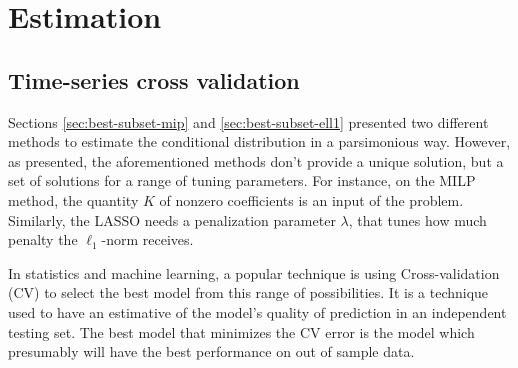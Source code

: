 \section{Estimation}

\subsection{Time-series cross validation}

Sections \ref{sec:best-subset-mip} and \ref{sec:best-subset-ell1} presented two different methods to estimate the conditional distribution in a parsimonious way. However, as presented, the aforementioned methods don't provide a unique solution, but a set of solutions for a range of tuning parameters. For instance, on the MILP method, the quantity $K$ of nonzero coefficients is an input of the problem. Similarly, the LASSO needs a penalization parameter $\lambda$, that tunes how much penalty the $\ell_1$-norm receives.

In statistics and machine learning, a popular technique is using Cross-validation (CV) to select the best model from this range of possibilities.
It is a technique used to have an estimative of the model's quality of prediction in an independent testing set. The best model that minimizes the CV error is the model which presumably will have the best performance on out of sample data.


